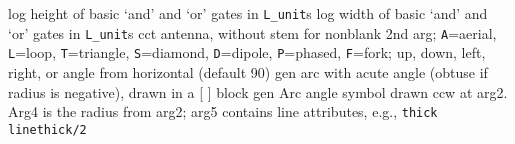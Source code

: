   {log}
  {height of basic `and' and `or' gates in {\tt L\_unit}s}
  {log}
  {width of basic `and' and `or' gates in {\tt L\_unit}s}
  {cct}
  {antenna, without stem for nonblank 2nd arg; {\tt A}=aerial,
    {\tt L}=loop, {\tt T}=triangle, {\tt S}=diamond, {\tt D}=dipole,
    {\tt P}=phased, {\tt F}=fork;
    up, down, left, right, or angle from horizontal (default 90) 
   }
  {gen}
  {arc with acute angle (obtuse if radius is negative), drawn in a [ ] block}
  {gen}
  {Arc angle symbol drawn ccw at arg2. Arg4 is the radius from arg2;
     arg5 contains line attributes, e.g., {\tt thick linethick/2}}

